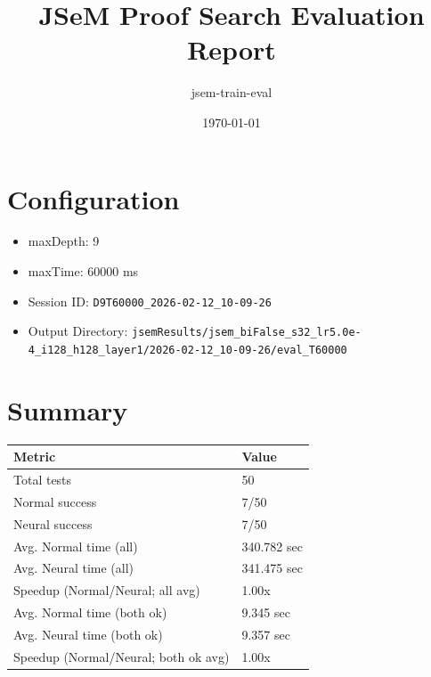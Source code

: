 \documentclass[a4paper,10pt]{article}
\title{JSeM Proof Search Evaluation Report}
\author{jsem-train-eval}
\date{\today}
\begin{document}
\maketitle

\section{Configuration}
\begin{itemize}
\item maxDepth: 9
\item maxTime: 60000 ms
\item Session ID: \texttt{D9T60000\_2026-02-12\_10-09-26}
\item Output Directory: \texttt{jsemResults/jsem\_biFalse\_s32\_lr5.0e-4\_i128\_h128\_layer1/2026-02-12\_10-09-26/eval\_T60000}
\end{itemize}

\section{Summary}
\begin{tabular}{ll}
\toprule
\textbf{Metric} & \textbf{Value} \\
\midrule
Total tests & 50 \\
Normal success & 7/50 \\
Neural success & 7/50 \\
\midrule
Avg. Normal time (all) & 340.782 sec \\
Avg. Neural time (all) & 341.475 sec \\
Speedup (Normal/Neural; all avg) & 1.00x \\
Avg. Normal time (both ok) & 9.345 sec \\
Avg. Neural time (both ok) & 9.357 sec \\
Speedup (Normal/Neural; both ok avg) & 1.00x \\
\bottomrule
\end{tabular}
\end{document}
